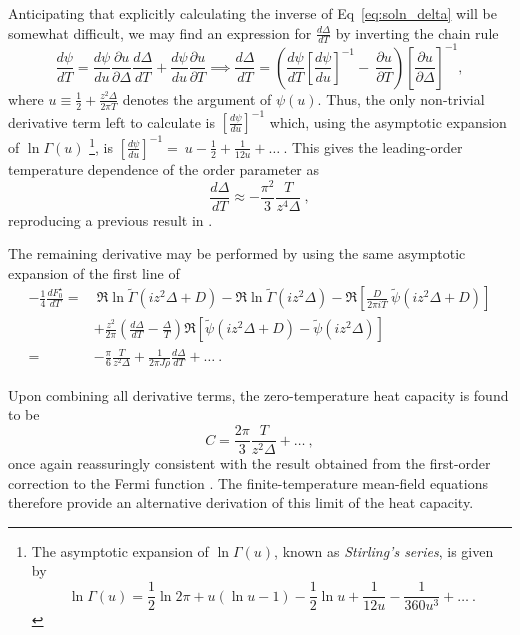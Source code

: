 \documentclass[12pt]{article}
\begin{document}
Anticipating that explicitly calculating the inverse of Eq~\eqref{eq:soln_delta} will be somewhat difficult, we may find an expression for $ \frac{d \Delta}{d T} $ by inverting the chain rule $$ \frac{d \psi}{dT} = \frac{d \psi}{du} \frac{\partial u}{\partial \Delta} \frac{d \Delta}{d T} + \frac{d \psi}{du} \frac{\partial u}{\partial T} \implies \frac{d \Delta}{d T} = \left( \frac{d \psi}{dT} \left[ \frac{d \psi}{d u} \right]^{-1} - ~ \frac{\partial u}{\partial T} \right) \left[ \frac{\partial u}{\partial \Delta} \right]^{-1} ,$$ where $ u \equiv \frac{1}{2} + \frac{z^2 \Delta}{2 \pi T} $ denotes the argument of $ \psi(u) $. Thus, the only non-trivial derivative term left to calculate is $ \left[ \frac{d \psi}{d u} \right]^{-1} $ which, using the asymptotic expansion of $ \ln{\Gamma(u)} $ \footnote{The asymptotic expansion of $ \ln{\Gamma(u)} $, known as \textit{Stirling's series}, is given by \cite{MathematicalFunctions} $$ \ln{\Gamma(u)} = \frac{1}{2} \ln{2 \pi} + u (\ln{u} - 1) - \frac{1}{2} \ln{u} + \frac{1}{12u} - \frac{1}{360 u^3} + \ldots ~. $$}, is $ \left[ \frac{d \psi}{du} \right]^{-1} = ~ u - \frac{1}{2} + \frac{1}{12 u} + \ldots ~ . $ This gives the leading-order temperature dependence of the order parameter as
\begin{equation}
\frac{d \Delta}{d T} \approx - \frac{\pi^2}{3} \frac{T}{z^4 \Delta} ~ ,
\label{eq:delta_derivative}
\end{equation}
reproducing a previous result in \cite{Draft}.

The remaining derivative may be performed by using the same asymptotic expansion of the first line of
\begin{align*}
- \frac{1}{4} \frac{d F_{0}^{\star}}{dT} =& ~ \Re \ln{\widetilde{\Gamma}(i z^2 \Delta + D)} - \Re \ln{\widetilde{\Gamma}(i z^2 \Delta)} - \Re{\left[ \frac{D}{2 \pi i T} ~ \widetilde{\psi}(i z^2 \Delta + D) \right]} \\
& + \frac{z^2}{2 \pi} \left( \frac{d \Delta}{d T} - \frac{\Delta}{T} \right) \Re{\left[ \widetilde{\psi}(i z^2 \Delta + D) - \widetilde{\psi}(i z^2 \Delta) \right]} \\
=& - \frac{\pi}{6} \frac{T}{z^2 \Delta} + \frac{1}{2 \pi J \rho} \frac{d \Delta}{d T} + \ldots ~ .
\end{align*}

Upon combining all derivative terms, the zero-temperature heat capacity is found to be
\begin{equation}
C = \frac{2 \pi}{3} \frac{T}{z^2 \Delta} + \ldots ~ ,
\label{eq:heat_capacity}
\end{equation}
once again reassuringly consistent with the result obtained from the first-order correction to the Fermi function \cite{Draft}. The finite-temperature mean-field equations therefore provide an alternative derivation of this limit of the heat capacity.
\end{document}
